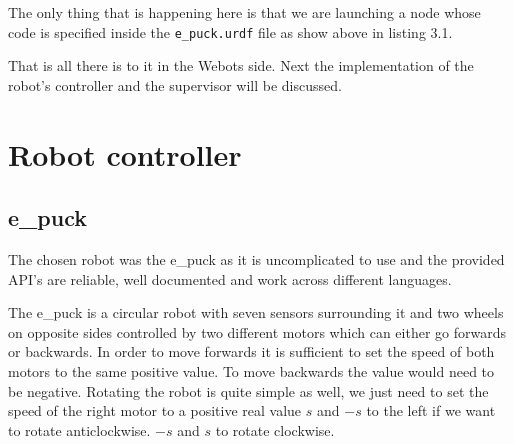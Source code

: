 The only thing that is happening here is that we are launching a node whose code is specified inside the \texttt{e\_puck.urdf} file as show above in listing 3.1.
\par
That is all there is to it in the Webots side. Next the implementation of the robot's controller and the supervisor will be discussed.
\section{Robot controller}
\subsection{e\_puck}
The chosen robot was the e\_puck as it is uncomplicated to use and the provided API's are reliable, well documented and work across different languages. 
\par
The e\_puck is a circular robot with seven sensors surrounding it and two wheels on opposite sides controlled by two different motors which can either go forwards or backwards. In order to move forwards it is sufficient to set the speed of both motors to the same positive value. To move backwards the value would need to be negative. Rotating the robot is quite simple as well, we just need to set the speed of the right motor to a positive real value $s$ and $-s$ to the left if we want to rotate anticlockwise. $-s$ and $s$ to rotate clockwise.
